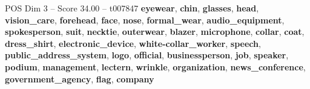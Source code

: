\begin{textsample}{POS Dim 3 – Score 34.00 – t007847}  \label{ex:f3_pos_001}
\textbf{eyewear}, \textbf{chin}, \textbf{glasses}, \textbf{head}, \textbf{vision\_care}, \textbf{forehead}, \textbf{face}, \textbf{nose}, \textbf{formal\_wear}, \textbf{audio\_equipment}, \textbf{spokesperson}, \textbf{suit}, \textbf{necktie}, \textbf{outerwear}, \textbf{blazer}, \textbf{microphone}, \textbf{collar}, \textbf{coat}, \textbf{dress\_shirt}, \textbf{electronic\_device}, \textbf{white-collar\_worker}, \textbf{speech}, \textbf{public\_address\_system}, \textbf{logo}, \textbf{official}, \textbf{businessperson}, \textbf{job}, \textbf{speaker}, \textbf{podium}, \textbf{management}, \textbf{lectern}, \textbf{wrinkle}, \textbf{organization}, \textbf{news\_conference}, \textbf{government\_agency}, \textbf{flag}, \textbf{company}

\end{textsample}
